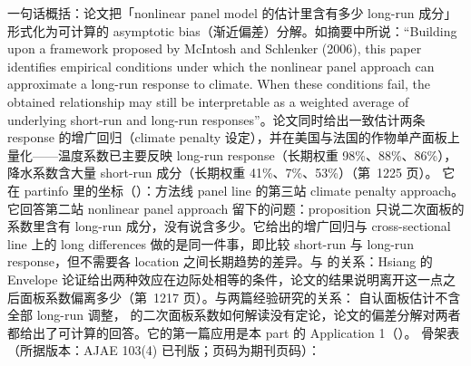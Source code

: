 一句话概括：论文把「nonlinear panel model 的估计里含有多少 long-run 成分」形式化为可计算的 asymptotic bias（渐近偏差）分解。如摘要中所说：``Building upon a framework proposed by McIntosh and Schlenker (2006), this paper identifies empirical conditions under which the nonlinear panel approach can approximate a long-run response to climate. When these conditions fail, the obtained relationship may still be interpretable as a weighted average of underlying short-run and long-run responses''\citep[第~1207 页]{merel2021climate}。论文同时给出一致估计两条 response 的增广回归（climate penalty 设定），并在美国与法国的作物单产面板上量化——温度系数已主要反映 long-run response（长期权重 98\%、88\%、86\%），降水系数含大量 short-run 成分（长期权重 41\%、7\%、53\%）（第~1225 页）。
它在 partinfo 里的坐标（）：方法线 panel line 的第三站 climate penalty approach。它回答第二站 nonlinear panel approach 留下的问题：proposition 只说二次面板的系数里含有 long-run 成分，没有说含多少。它给出的增广回归与 cross-sectional line 上的 long differences 做的是同一件事，即比较 short-run 与 long-run response，但不需要各 location 之间长期趋势的差异。与  的关系：Hsiang 的 Envelope 论证给出两种效应在边际处相等的条件，论文的结果说明离开这一点之后面板系数偏离多少（第~1217 页）。与两篇经验研究的关系： 自认面板估计不含全部 long-run 调整， 的二次面板系数如何解读没有定论，论文的偏差分解对两者都给出了可计算的回答。它的第一篇应用是本 part 的 Application 1（）。
骨架表（所据版本：AJAE 103(4) 已刊版；页码为期刊页码）：

